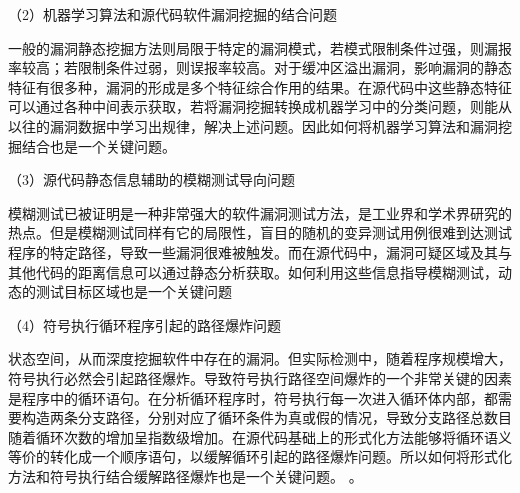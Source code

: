 （2）机器学习算法和源代码软件漏洞挖掘的结合问题

一般的漏洞静态挖掘方法则局限于特定的漏洞模式，若模式限制条件过强，则漏报率较高；若限制条件过弱，则误报率较高。对于缓冲区溢出漏洞，影响漏洞的静态特征有很多种，漏洞的形成是多个特征综合作用的结果。在源代码中这些静态特征可以通过各种中间表示获取，若将漏洞挖掘转换成机器学习中的分类问题，则能从以往的漏洞数据中学习出规律，解决上述问题。因此如何将机器学习算法和漏洞挖掘结合也是一个关键问题。



（3）源代码静态信息辅助的模糊测试导向问题

模糊测试已被证明是一种非常强大的软件漏洞测试方法，是工业界和学术界研究的热点。但是模糊测试同样有它的局限性，盲目的随机的变异测试用例很难到达测试程序的特定路径，导致一些漏洞很难被触发。而在源代码中，漏洞可疑区域及其与其他代码的距离信息可以通过静态分析获取。如何利用这些信息指导模糊测试，动态的测试目标区域也是一个关键问题

（4）符号执行循环程序引起的路径爆炸问题

状态空间，从而深度挖掘软件中存在的漏洞。但实际检测中，随着程序规模增大，符号执行必然会引起路径爆炸。导致符号执行路径空间爆炸的一个非常关键的因素是程序中的循环语句。在分析循环程序时，符号执行每一次进入循环体内部，都需要构造两条分支路径，分别对应了循环条件为真或假的情况，导致分支路径总数目随着循环次数的增加呈指数级增加。在源代码基础上的形式化方法能够将循环语义等价的转化成一个顺序语句，以缓解循环引起的路径爆炸问题。所以如何将形式化方法和符号执行结合缓解路径爆炸也是一个关键问题。
。

